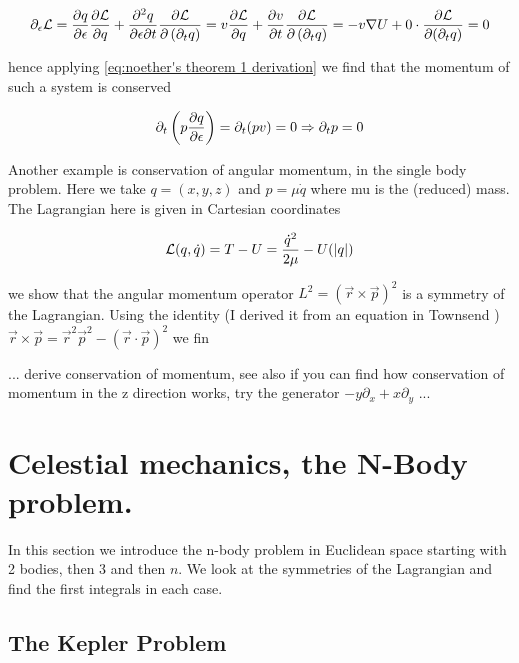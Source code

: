 \documentclass[12pt]{article}
\begin{document}
$$\partial_\epsilon \mathcal L = \frac{\partial q}{\partial \epsilon}\frac{\partial \mathcal L}{\partial q} + \frac{\partial^2 q}{\partial \epsilon\partial t}\frac{\partial \mathcal L}{\partial \left( \partial_t q \right)} = v\frac{\partial \mathcal L}{\partial q} + \frac{\partial v}{\partial t}\frac{\partial \mathcal L}{\partial \left(\partial_t q\right)} = -v\nabla U + 0\cdot \frac{\partial \mathcal L}{\partial (\partial_t q)} = 0$$

hence applying \eqref{eq:noether's theorem 1 derivation} we find that the momentum of such a system is conserved

\begin{equation}\label{eq:momentum conserved}
    \partial_t \left(p\frac{\partial q}{\partial \epsilon}\right) = \partial_t (pv) = 0 \Rightarrow \partial_t p = 0
\end{equation}

 Another example is conservation of angular momentum, in the single body problem. Here we take $q = (x,y,z)$ and $p = \mu \dot q$ where mu is the (reduced) mass. The Lagrangian here is given in Cartesian coordinates 

\begin{equation}\label{eq:lagrangian one body problem}
    \mathcal L(q,\dot q) = T - U = \frac{\dot q^2}{2\mu} - U(|q|)
\end{equation}

we show that the angular momentum operator $L^2 = \left(\vec r\times \vec p\right)^2$ is a symmetry of the Lagrangian. Using the identity (I derived it from an equation in Townsend \cite{Townsend}) $\vec r\times\vec p = \vec r^2\vec p^2 - (\vec r\cdot \vec p)^2$ we fin

... derive conservation of momentum, see also if you can find how conservation of momentum in the z direction works, try the generator $-y\partial_x + x\partial_y$ ... 

\section{Celestial mechanics, the N-Body problem.}

In this section we introduce the n-body problem in Euclidean space starting with 2 bodies, then 3 and then $n$. We look at the symmetries of the Lagrangian and find the first integrals in each case. 



\subsection{The Kepler Problem}
\end{document}
